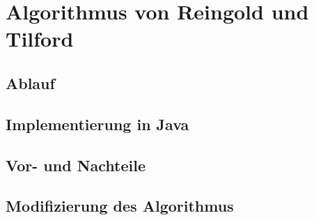 \label{chap:kapitel3_3}
\section{Algorithmus von Reingold und Tilford}

\subsection{Ablauf}

\subsection{Implementierung in Java}

\subsection{Vor- und Nachteile}

\subsection{Modifizierung des Algorithmus}